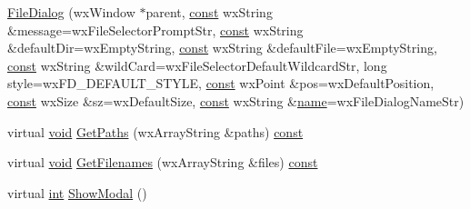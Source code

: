 \begin{DoxyCompactItemize}
\hyperlink{class_file_dialog_ace5a468fcd70436281f288509ce13574}{File\+Dialog} (wx\+Window $\ast$parent, \hyperlink{getopt1_8c_a2c212835823e3c54a8ab6d95c652660e}{const} wx\+String \&message=wx\+File\+Selector\+Prompt\+Str, \hyperlink{getopt1_8c_a2c212835823e3c54a8ab6d95c652660e}{const} wx\+String \&default\+Dir=wx\+Empty\+String, \hyperlink{getopt1_8c_a2c212835823e3c54a8ab6d95c652660e}{const} wx\+String \&default\+File=wx\+Empty\+String, \hyperlink{getopt1_8c_a2c212835823e3c54a8ab6d95c652660e}{const} wx\+String \&wild\+Card=wx\+File\+Selector\+Default\+Wildcard\+Str, long style=wx\+F\+D\+\_\+\+D\+E\+F\+A\+U\+L\+T\+\_\+\+S\+T\+Y\+LE, \hyperlink{getopt1_8c_a2c212835823e3c54a8ab6d95c652660e}{const} wx\+Point \&pos=wx\+Default\+Position, \hyperlink{getopt1_8c_a2c212835823e3c54a8ab6d95c652660e}{const} wx\+Size \&sz=wx\+Default\+Size, \hyperlink{getopt1_8c_a2c212835823e3c54a8ab6d95c652660e}{const} wx\+String \&\hyperlink{lib_2expat_8h_a1b49b495b59f9e73205b69ad1a2965b0}{name}=wx\+File\+Dialog\+Name\+Str)
\item 
virtual \hyperlink{sound_8c_ae35f5844602719cf66324f4de2a658b3}{void} \hyperlink{class_file_dialog_a0181bb90e4d72427257068a8627b5655}{Get\+Paths} (wx\+Array\+String \&paths) \hyperlink{getopt1_8c_a2c212835823e3c54a8ab6d95c652660e}{const} 
\item 
virtual \hyperlink{sound_8c_ae35f5844602719cf66324f4de2a658b3}{void} \hyperlink{class_file_dialog_af226bdb23f7fc3e733dc51e4fe16bcdd}{Get\+Filenames} (wx\+Array\+String \&files) \hyperlink{getopt1_8c_a2c212835823e3c54a8ab6d95c652660e}{const} 
\item 
virtual \hyperlink{xmltok_8h_a5a0d4a5641ce434f1d23533f2b2e6653}{int} \hyperlink{class_file_dialog_ab1592208e8f7e6a877e2f5a162689bc9}{Show\+Modal} ()
\end{DoxyCompactItemize}
